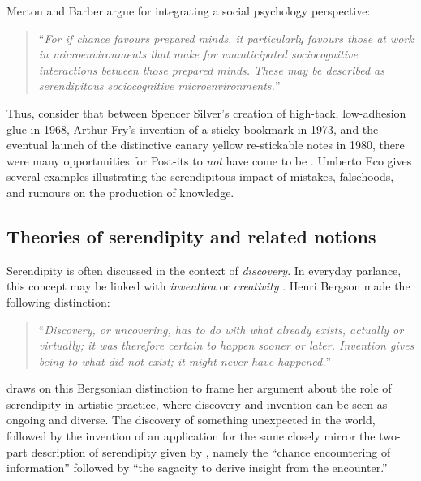 Merton and Barber argue for integrating a social psychology
perspective:
\begin{quote}
``\emph{For if chance favours prepared minds, it particularly favours
    those at work in microenvironments that make for unanticipated
    sociocognitive interactions between those prepared minds. These
    may be described as serendipitous sociocognitive
    microenvironments.}'' \cite[p.~259--260]{merton}
\end{quote}
Thus, consider that between Spencer Silver's creation of high-tack,
low-adhesion glue in 1968, Arthur Fry's invention of a sticky bookmark
in 1973, and the eventual launch of the distinctive canary yellow
re-stickable notes in 1980, there were many opportunities for
Post-its\textsuperscript{\textregistered} to \emph{not} have come to
be \cite{tce-postits}.  Umberto Eco \cite{eco2013serendipities} gives
several examples illustrating the serendipitous impact of mistakes,
falsehoods, and rumours on the production of knowledge.

\subsection{Theories of serendipity and related notions} \label{sec:serendipityInvention}
Serendipity is often discussed in the context of \emph{discovery}.  In
everyday parlance, this concept may be linked with \emph{invention} or
\emph{creativity} \cite{jordanous16plos}.  Henri Bergson made the
following distinction:
\begin{quote}
``\emph{Discovery, or uncovering, has to do with what already exists,
    actually or virtually; it was therefore certain to happen sooner
    or later.  Invention gives being to what did not exist; it might
    never have happened.}''    \cite[p. 58]{bergson1946creative}
\end{quote}
\citet{mckay-serendipity} draws on this Bergsonian distinction to
frame her argument about the role of serendipity in artistic practice,
where discovery and invention can be seen as ongoing and diverse.
The discovery of something unexpected in the world, followed by the
invention of an application for the same closely mirror the two-part
description of serendipity given by \citet{andre2009discovery}, namely
the ``chance encountering of information'' followed by ``the sagacity
to derive insight from the encounter.''

